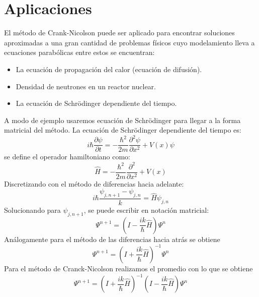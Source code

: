 \documentclass[11pt]{article} %
\begin{document}
\section*{Aplicaciones}
El método de Crank-Nicolson puede ser aplicado para encontrar soluciones aproximadas a una gran cantidad de problemas físicos cuyo modelamiento lleva a ecuaciones parabólicas entre estos se encuentran:  
\begin{itemize}
    \item La ecuación de propagación del calor (ecuación de difusión).
    \item Densidad de neutrones en un reactor nuclear.
    \item La ecuación de Schrödinger dependiente del tiempo.
\end{itemize}
A modo de ejemplo usaremos ecuación de Schrödinger para llegar a la forma matricial del método. La ecuación de Schrödinger dependiente del tiempo es:
$$
i\hbar\frac{\partial \psi }{\partial t} = -\frac{\hbar^2}{2m}\frac{\partial^2 \psi }{\partial x^2}+V(x)\psi 
$$
se define el operador hamiltoniano como:
$$
\hat{H} = -\frac{\hbar^2}{2m}\frac{\partial^2 }{\partial x^2}+V(x)
$$
Discretizando con el método de diferencias hacia adelante:
$$
i\hbar\frac{\psi_{j,n+1}-\psi_{j,n}}{k}=\hat{H}\psi _{j,n}
$$
Solucionando para $\psi_{j,n+1}$, se puede escribir en notación matricial:
$$
\Psi^{n+1}=\left ( I-\frac{ik}{\hbar}\hat{H} \right )\Psi^{n}
$$
Análogamente para el método de las diferencias hacia atrás se obtiene
$$
\Psi^{n+1}=\left ( I+\frac{ik}{\hbar}\hat{H} \right )^{-1}\Psi^{n}
$$
Para el método de Cranck-Nicolson realizamos el promedio con lo que se obtiene
$$
\Psi^{n+1}=\left ( I+\frac{ik}{\hbar}\hat{H} \right )^{-1}\left( I-\frac{ik}{\hbar}\hat{H} \right )\Psi^{n}
$$


%

%

\end{document}
